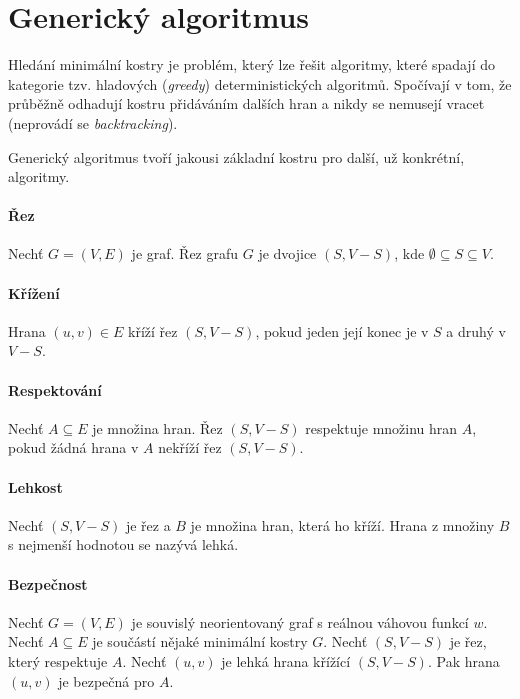 
\section{Generický algoritmus}

Hledání minimální kostry je problém, který lze řešit algoritmy, které spadají do kategorie tzv. hladových (\textit{greedy}) deterministických algoritmů. Spočívají v tom, že průběžně odhadují kostru přidáváním dalších hran a nikdy se nemusejí vracet (neprovádí se \textit{backtracking}).

\bigskip

\noindent Generický algoritmus tvoří jakousi základní kostru pro další, už konkrétní, algoritmy.

\paragraph*{Řez} Nechť $G = (V, E)$ je graf. Řez grafu $G$ je dvojice $(S, V - S)$, kde $\emptyset \subseteq S \subseteq V$.

\paragraph*{Křížení} Hrana $(u, v) \in E$ kříží řez $(S, V - S)$, pokud jeden její konec je v $S$ a druhý v $V - S$.

\paragraph*{Respektování} Nechť $A \subseteq E$ je množina hran. Řez $(S, V - S)$ respektuje množinu hran $A$, pokud žádná hrana v $A$ nekříží řez $(S, V - S)$.

\paragraph*{Lehkost} Nechť $(S, V - S)$ je řez a $B$ je množina hran, která ho kříží. Hrana z množiny $B$ s nejmenší hodnotou se nazývá lehká.

\paragraph*{Bezpečnost} Nechť $G = (V, E)$ je souvislý neorientovaný graf s reálnou váhovou funkcí $w$. Nechť $A \subseteq E$ je součástí nějaké minimální kostry $G$. Nechť $(S, V - S)$ je řez, který respektuje $A$. Nechť $(u, v)$ je lehká hrana křížící $(S, V - S)$. Pak hrana $(u, v)$ je bezpečná pro $A$.


